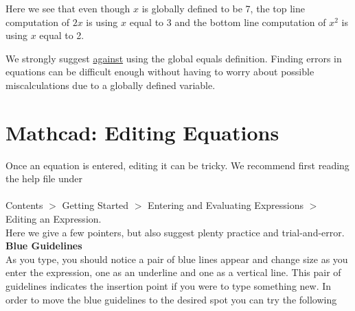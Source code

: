 Here we see that even though $x$ is globally defined to be 7, the top line computation of $2x$ is using $x$ equal to 3 and the bottom line computation of $x^2$ is using $x$ equal to 2.

We strongly suggest \underline{against} using the global equals definition.  Finding errors in equations can be difficult enough without having to worry about possible miscalculations due to a globally defined variable.  

\section{Mathcad: Editing Equations}\label{sec:Mathcad_editing_equations}

Once an equation is entered, editing it can be tricky.  We recommend first reading the help file under\\ 
\\
Contents $>$ Getting Started $>$ Entering and Evaluating Expressions $>$ Editing an Expression.\\

Here we give a few pointers, but also suggest plenty practice and trial-and-error.\\

\noindent \large \textsf{\textbf{Blue Guidelines}} \normalsize\\

As you type, you should notice a pair of blue lines appear and change size as you enter the expression, one as an underline and one as a vertical line.  This pair of guidelines indicates the insertion point if you were to type something new.  In order to move the blue guidelines to the desired spot you can try the following\\

